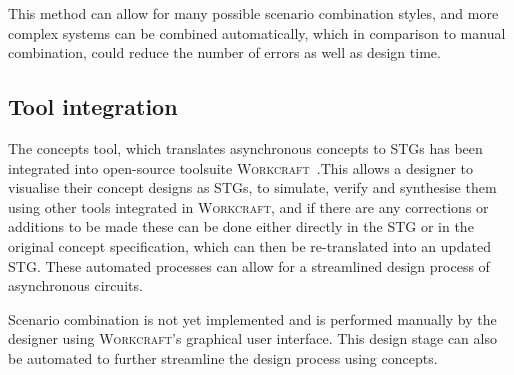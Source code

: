 \documentclass[british, journal]{IEEEtran}
\newcommand{\noun}[1]{\textsc{#1}}
\begin{document}
This method can allow for many possible scenario combination
styles, and more complex systems can be combined automatically, which
in comparison to manual combination, could reduce the number of errors
as well as design time.

\subsection{Tool integration}

The concepts tool, which translates asynchronous concepts to STGs has been
integrated into open-source toolsuite \noun{Workcraft}~\cite{Workcraft_website}.This allows a designer to visualise their concept designs as STGs, to simulate,
verify and synthesise them using other tools integrated in \noun{Workcraft},
and if there are any corrections or additions to be made these can be done
either
directly in the STG or in the original concept specification, which can then
be re-translated into an updated STG. These automated processes can allow for a
streamlined design process of asynchronous circuits.

Scenario combination is not yet implemented and is performed manually by
the designer using \noun{Workcraft}'s graphical user interface. This
design stage can also be automated to further streamline the design process
using concepts.
\end{document}
